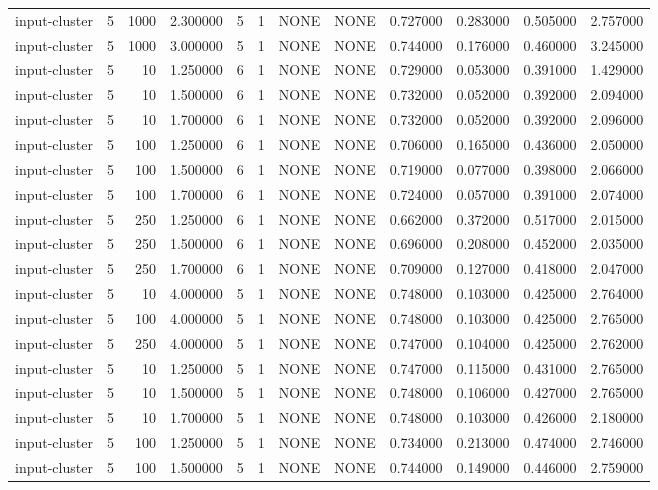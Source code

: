 \begin{tabular}{lrrrllllrrrr}
input-cluster & 5 & 1000 & 2.300000 & 5 & 1 & NONE & NONE & 0.727000 & 0.283000 & 0.505000 & 2.757000 \\
input-cluster & 5 & 1000 & 3.000000 & 5 & 1 & NONE & NONE & 0.744000 & 0.176000 & 0.460000 & 3.245000 \\
input-cluster & 5 & 10 & 1.250000 & 6 & 1 & NONE & NONE & 0.729000 & 0.053000 & 0.391000 & 1.429000 \\
input-cluster & 5 & 10 & 1.500000 & 6 & 1 & NONE & NONE & 0.732000 & 0.052000 & 0.392000 & 2.094000 \\
input-cluster & 5 & 10 & 1.700000 & 6 & 1 & NONE & NONE & 0.732000 & 0.052000 & 0.392000 & 2.096000 \\
input-cluster & 5 & 100 & 1.250000 & 6 & 1 & NONE & NONE & 0.706000 & 0.165000 & 0.436000 & 2.050000 \\
input-cluster & 5 & 100 & 1.500000 & 6 & 1 & NONE & NONE & 0.719000 & 0.077000 & 0.398000 & 2.066000 \\
input-cluster & 5 & 100 & 1.700000 & 6 & 1 & NONE & NONE & 0.724000 & 0.057000 & 0.391000 & 2.074000 \\
input-cluster & 5 & 250 & 1.250000 & 6 & 1 & NONE & NONE & 0.662000 & 0.372000 & 0.517000 & 2.015000 \\
input-cluster & 5 & 250 & 1.500000 & 6 & 1 & NONE & NONE & 0.696000 & 0.208000 & 0.452000 & 2.035000 \\
input-cluster & 5 & 250 & 1.700000 & 6 & 1 & NONE & NONE & 0.709000 & 0.127000 & 0.418000 & 2.047000 \\
input-cluster & 5 & 10 & 4.000000 & 5 & 1 & NONE & NONE & 0.748000 & 0.103000 & 0.425000 & 2.764000 \\
input-cluster & 5 & 100 & 4.000000 & 5 & 1 & NONE & NONE & 0.748000 & 0.103000 & 0.425000 & 2.765000 \\
input-cluster & 5 & 250 & 4.000000 & 5 & 1 & NONE & NONE & 0.747000 & 0.104000 & 0.425000 & 2.762000 \\
input-cluster & 5 & 10 & 1.250000 & 5 & 1 & NONE & NONE & 0.747000 & 0.115000 & 0.431000 & 2.765000 \\
input-cluster & 5 & 10 & 1.500000 & 5 & 1 & NONE & NONE & 0.748000 & 0.106000 & 0.427000 & 2.765000 \\
input-cluster & 5 & 10 & 1.700000 & 5 & 1 & NONE & NONE & 0.748000 & 0.103000 & 0.426000 & 2.180000 \\
input-cluster & 5 & 100 & 1.250000 & 5 & 1 & NONE & NONE & 0.734000 & 0.213000 & 0.474000 & 2.746000 \\
input-cluster & 5 & 100 & 1.500000 & 5 & 1 & NONE & NONE & 0.744000 & 0.149000 & 0.446000 & 2.759000 \\

\end{tabular}
